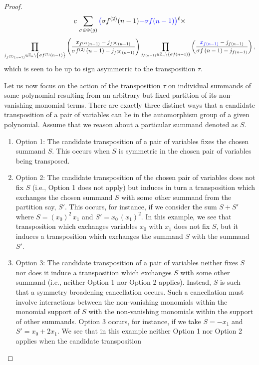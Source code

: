 \begin{proof}
\[
c\,\sum_{\sigma\in\Phi(g)}{\color{blue}\big(}\sigma f^{(2)}(n-1){\color{blue}-\sigma f(n-1)\big)}^{\ell}\times
\]
\[
\prod_{j_{f^{(2)}\left(n-1\right)}\in\mathbb{Z}_{n}\backslash\left\{ \sigma f^{(2)}\left(n-1\right)\right\} }\left(\frac{x_{f^{(2)}\left(n-1\right)}-j_{f^{(2)}\left(n-1\right)}}{\sigma f^{(2)}\left(n-1\right)-j_{f^{(2)}\left(n-1\right)}}\right)\prod_{j_{f\left(n-1\right)}\in\mathbb{Z}_{n}\backslash\left\{ \sigma f\left(n-1\right)\right\} }\left(\frac{{\color{blue}x_{f\left(n-1\right)}}-j_{f\left(n-1\right)}}{\sigma f\left(n-1\right)-j_{f\left(n-1\right)}}\right),
\]
which is seen to be up to sign asymmetric to the transposition $\tau$.

Let us now focus on the action of the transposition $\tau$ on individual summands of some polynomial resulting from an arbitrary but fixed partition
of its non-vanishing monomial terms. There are exactly three distinct ways that a candidate
transposition of a pair of variables can lie in the automorphism group of a
given polynomial.  Assume that we reason about
a particular summand denoted as $S$.
\begin{enumerate}
\item Option 1: The candidate transposition of a pair of variables fixes
the chosen summand $S$. This occurs when $S$ is symmetric in the
chosen pair of variables being transposed.
\item Option 2: The candidate transposition of the chosen pair of variables
does not fix $S$ (i.e., Option 1 does not apply) but induces in turn
a transposition which exchanges the chosen summand $S$ with some
other summand from the partition say, $S'$. This occurs, for instance,
if we consider the sum $S+S'$ where $S=(x_{0})^{2}\,x_{1}$ and $S'=x_{0}\,(x_{1})^{2}$.
In this example, we see that transposition which exchanges variables
$x_{0}$ with $x_{1}$ does not fix $S$, but it induces a transposition
which exchanges the summand $S$ with the summand $S'$.
\item Option 3: The candidate transposition of a pair of variables neither
fixes $S$ nor does it induce a transposition which exchanges $S$
with some other summand (i.e., neither Option 1 nor Option 2 applies).
Instead, $S$ is such that a symmetry broadening cancellation occurs.
Such a cancellation must involve interactions between the non-vanishing
monomials within the monomial support of $S$ with the non-vanishing monomials
within the support of other summands. Option 3 occurs, for instance,
if we take $S=-x_{1}$ and $S'=x_{0}+2x_{1}$. We see that in this
example neither Option 1 nor Option 2 applies when the candidate transposition

\end{enumerate}
\end{proof}
